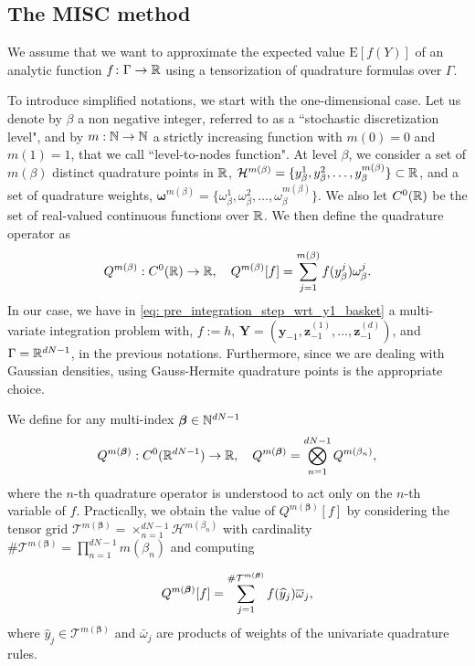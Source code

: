 \subsection{The MISC method} \label{sec:Details of the MISC}

We assume that we want to approximate the expected value $\text{E}[f(Y)]$ of an analytic function $f\colon \Gamma \to \mathbb{R}$ using a tensorization of quadrature formulas over $\Gamma$.

To introduce simplified notations, we start with the one-dimensional case. Let us denote by $\beta$ a non negative integer, referred to as a ``stochastic discretization level", and by $m: \mathbb{N} \rightarrow \mathbb{N}$  a strictly increasing function with $m(0)=0$ and $m(1)=1$, that we call  ``level-to-nodes function". At level $\beta$, we consider a set of $m(\beta)$ distinct quadrature points in $\mathbb{R}$, $\mathcal{H}^{m(\beta)}=\{y^1_\beta,y^2_\beta,\dots,y_\beta^{m(\beta)}\} \subset \mathbb{R}$, and a set of quadrature weights, $\boldsymbol{\omega}^{m(\beta)}=\{\omega^1_\beta,\omega^2_\beta,\dots,\omega_\beta^{m(\beta)}\}$. We also let $C^0(\mathbb{R})$ be the set of real-valued continuous functions over $\mathbb{R}$. We then define the quadrature operator as
\begin{equation*}
Q^{m(\beta)}:C^0(\mathbb{R}) \rightarrow \mathbb{R}, \quad Q^{m(\beta)}[f]= \sum_{j=1}^{m(\beta)} f(y^j_\beta) \omega_\beta^j.
\end{equation*}
In our case, we have in \eqref{eq: pre_integration_step_wrt_y1_basket} a multi-variate integration problem with, $f:=h$, $\mathbf{Y}=(\mathbf{y}_{-1},\mathbf{z}^{(1)}_{-1},\dots,\mathbf{z}^{(d)}_{-1})$,  and  $\Gamma=\mathbb{R}^{dN-1}$, in the previous notations.  Furthermore, since we are dealing with Gaussian densities, using Gauss-Hermite quadrature points is the appropriate choice.

We define for any multi-index $\boldsymbol{\beta} \in \mathbb{N}^{dN-1}$
$$Q^{m(\boldsymbol{\beta})}: C^0(\mathbb{R}^{dN-1}) \rightarrow \mathbb{R},\quad  Q^{m(\boldsymbol{\beta})}= \bigotimes_{n = 1}^{dN-1} Q^{m(\beta_n)} , $$
where the $n$-th quadrature operator is understood to act only on the $n$-th variable of $f$. Practically, we obtain the value of $Q^{m(\boldsymbol{\beta})}[f]$  by considering the tensor grid $\mathcal{T}^{m(\boldsymbol{\beta})}= \times_{n = 1}^{dN-1}  \mathcal{H}^{m(\beta_n)}$ with cardinality $\#\mathcal{T}^{m(\boldsymbol{\beta})}=\prod_{n=1}^{dN-1} m (\beta_n)$ and computing

$$ Q^{m(\boldsymbol{\beta})}[f]= \sum_{j=1}^{\#\mathcal{T}^{m(\boldsymbol{\beta})}} f(\widehat{y}_j) \overline{\omega}_j ,$$
where $\hat{y}_j \in \mathcal{T}^{m(\boldsymbol{\beta})}$ and $\bar{\omega}_j$ are  products of weights of the univariate quadrature rules.

